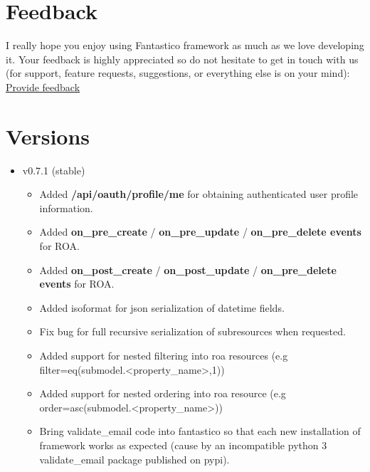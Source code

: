 \documentclass[letterpaper,10pt,english]{sphinxmanual}
\begin{document}
\section{Feedback}
\label{changes:feedback}
I really hope you enjoy using Fantastico framework as much as we love developing it. Your feedback is highly appreciated
so do not hesitate to get in touch with us (for support, feature requests, suggestions, or everything else is on your mind):
\href{https://docs.google.com/forms/d/1tKBopU3lfDB\_w8F4h7Rl1Rn4uydAJq-nha09L\_ptJck/edit?usp=sharing}{Provide feedback}


\section{Versions}
\label{changes:versions}\begin{itemize}
\item {} 
v0.7.1 (stable)
\begin{itemize}
\item {} 
Added \textbf{/api/oauth/profile/me} for obtaining authenticated user profile information.

\item {} 
Added \textbf{on\_pre\_create} / \textbf{on\_pre\_update} / \textbf{on\_pre\_delete events} for ROA.

\item {} 
Added \textbf{on\_post\_create} / \textbf{on\_post\_update} / \textbf{on\_pre\_delete events} for ROA.

\item {} 
Added isoformat for json serialization of datetime fields.

\item {} 
Fix bug for full recursive serialization of subresources when requested.

\item {} 
Added support for nested filtering into roa resources (e.g filter=eq(submodel.\textless{}property\_name\textgreater{},1))

\item {} 
Added support for nested ordering into roa resource (e.g order=asc(submodel.\textless{}property\_name\textgreater{}))

\item {} 
Bring validate\_email code into fantastico so that each new installation of framework works as expected (cause by an incompatible python 3 validate\_email package published on pypi).

\end{itemize}


\end{itemize}
\end{document}
